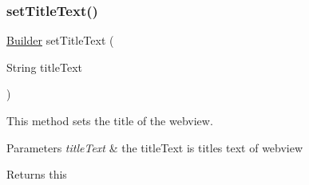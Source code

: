 \subsubsection{\texorpdfstring{set\+Title\+Text()}{setTitleText()}}
{\footnotesize\ttfamily \hyperlink{classcom_1_1toast_1_1android_1_1gamebase_1_1_gamebase_web_view_configuration_1_1_builder}{Builder} set\+Title\+Text (\begin{DoxyParamCaption}\item[{String}]{title\+Text }\end{DoxyParamCaption})}



This method sets the title of the webview. 


\begin{DoxyParams}{Parameters}
{\em title\+Text} & the title\+Text is title\textquotesingle{}s text of webview \\
\hline
\end{DoxyParams}
\begin{DoxyReturn}{Returns}
this 
\end{DoxyReturn}
